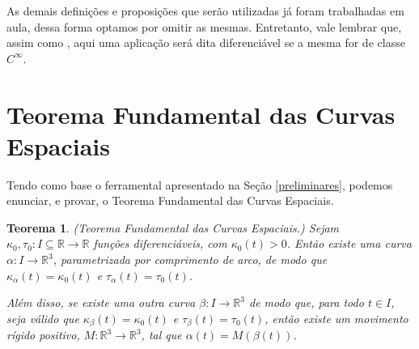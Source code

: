 \documentclass[11pt,letterpaper,twocolumn]{article}
\newtheorem{theorem}{Teorema}
\begin{document}
As demais definições e proposições que serão utilizadas já foram trabalhadas em aula, dessa forma optamos por omitir as mesmas. Entretanto, vale lembrar que, assim como \cite{lima}, aqui uma aplicação será dita diferenciável se a mesma for de classe $C^\infty$.

\section{Teorema Fundamental das Curvas Espaciais}
\justify

Tendo como base o ferramental apresentado na Seção \ref{preliminares}, podemos enunciar, e provar, o Teorema Fundamental das Curvas Espaciais.

\begin{theorem}(Teorema Fundamental das Curvas Espaciais.)
    Sejam $\kappa_0, \tau_0 : I\subseteq \mathbb{R}\to \mathbb{R}$ funções diferenciáveis, com $\kappa_0(t) > 0$. Então existe uma curva $\alpha : I\to \mathbb{R}^3$, parametrizada por comprimento de arco, de modo que $\kappa_\alpha(t) = \kappa_0(t)$ e $\tau_\alpha(t) = \tau_0(t)$.
    
    Além disso, se existe uma outra curva $\beta : I\to \mathbb{R}^3$ de modo que, para todo $t\in I$, seja válido que $\kappa_\beta(t) = \kappa_0(t)$ e $\tau_\beta(t) = \tau_0(t)$, então existe um movimento rígido positivo, $M : \mathbb{R}^3\to \mathbb{R}^3$, tal que $\alpha(t) = M(\beta(t))$.
\end{theorem}
\end{document}
